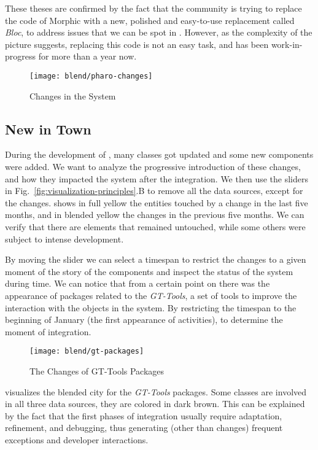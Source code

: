 These theses are confirmed by the fact that the community is trying to replace the code of Morphic with a new, polished and easy-to-use replacement called \textit{Bloc}, to address issues that we can be spot in .
However, as the complexity of the picture suggests, replacing this code is not an easy task, and has been work-in-progress for more than a year now.



\begin{figure*}[ht]
\centering
\texttt{[image: blend/pharo-changes]}
\caption{Changes in the \pha System}
\label{fig:pharo-changes}
\end{figure*}

\subsection{New in Town}

During the development of , many classes got updated and some new components were added.
We want to analyze the progressive introduction of these changes, and how they impacted the system after the integration.
We then use the sliders in Fig.~\ref{fig:visualization-principles}.B to remove all the data sources, except for the changes.
 shows in full yellow the entities touched by a change in the last five months, and in blended yellow the changes in the previous five months.
We can verify that there are elements that remained untouched, while some others were subject to intense development.

By moving the slider we can select a timespan to restrict the changes to a given moment of the story of the components and inspect the status of the system during time.
We can notice that from a certain point on there was the appearance of packages related to the \emph{GT-Tools}, a set of tools to improve the interaction with the objects in the system.
By restricting the timespan to the beginning of January (\ie the first appearance of activities), to determine the moment of integration.

\begin{figure}[h]
\centering
\texttt{[image: blend/gt-packages]}
\caption{The Changes of GT-Tools Packages}
\label{fig:gt-spotter-packages}
\end{figure}

 visualizes the blended city for the \emph{GT-Tools} packages.
Some classes are involved in all three data sources, \ie they are colored in dark brown.
This can be explained by the fact that the first phases of integration usually require adaptation, refinement, and debugging, thus generating (other than changes) frequent exceptions and developer interactions.

